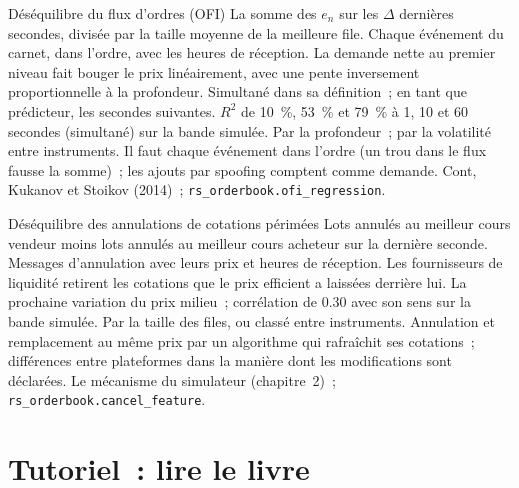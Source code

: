 \begin{predictorcard}{Déséquilibre du flux d'ordres (OFI)}\label{pred:rs:order-book-features:ofi}
 La somme des $e_n$ sur les $\Delta$ dernières secondes, divisée par la taille moyenne de la meilleure file.
 Chaque événement du carnet, dans l'ordre, avec les heures de réception.
 La demande nette au premier niveau fait bouger le prix linéairement, avec une pente inversement proportionnelle à la profondeur.
 Simultané dans sa définition~; en tant que prédicteur, les secondes suivantes. $R^2$ de 10~\%, 53~\% et 79~\% à 1, 10 et 60
secondes (simultané) sur la bande simulée.
 Par la profondeur~; par la volatilité entre instruments.
 Il faut chaque événement dans l'ordre (un trou dans le flux fausse la somme)~; les ajouts par spoofing comptent comme demande.
 Cont, Kukanov et Stoikov (2014)~; \texttt{rs\_orderbook.ofi\_regression}.
\end{predictorcard}

\begin{predictorcard}{Déséquilibre des annulations de cotations périmées}\label{pred:rs:order-book-features:cancel}
 Lots annulés au meilleur cours vendeur moins lots annulés au meilleur cours acheteur sur la dernière seconde.
 Messages d'annulation avec leurs prix et heures de réception.
 Les fournisseurs de liquidité retirent les cotations que le prix efficient a laissées derrière lui.
 La prochaine variation du prix milieu~; corrélation de 0.30 avec son sens sur la bande simulée.
 Par la taille des files, ou classé entre instruments.
 Annulation et remplacement au même prix par un algorithme qui rafraîchit ses cotations~; différences entre plateformes
dans la manière dont les modifications sont déclarées.
 Le mécanisme du simulateur (chapitre~2)~; \texttt{rs\_orderbook.cancel\_feature}.
\end{predictorcard}

\section{Tutoriel~: lire le livre}\label{tut:rs:order-book-features:read}

